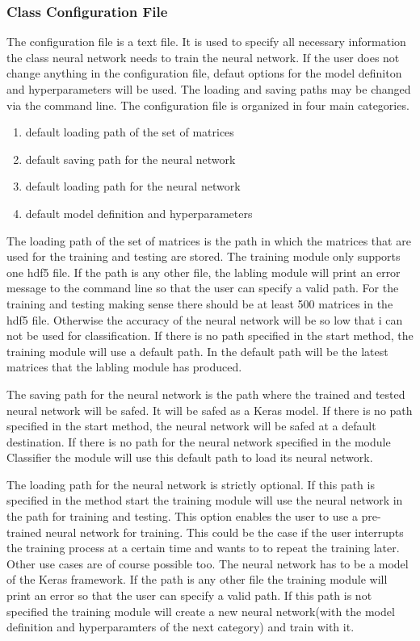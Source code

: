 \documentclass[parskip=full]{scrartcl}
\begin{document}
\subsubsection{Class Configuration File}
The configuration file is a text file.
It is used to specify all necessary information the class neural network needs to train the neural network.
If the user does not change anything in the configuration file, defaut options for the model definiton and hyperparameters will be used. The loading and saving paths may be changed via the command line. The configuration file is organized in four main categories.
\begin{enumerate}
\item default loading path of the set of matrices 
\item default saving path for the neural network
\item default loading path for the neural network
\item default model definition and hyperparameters
\end{enumerate}
The loading path of the set of matrices is the path in which the matrices that are used for the training and testing are stored.
The training module only supports one hdf5 file.
If the path is any other file, the labling module will print an error message to the command line so that the user can specify a valid path.
For the training and testing making sense there should be at least 500 matrices in the hdf5 file.
Otherwise the accuracy of the neural network will be so low that i can not be used for classification.
If there is no path specified in the start method, the training module will use a default path.
In the default path will be the latest matrices that the labling module has produced. \newline

The saving path for the neural network is the path where the trained and tested neural network will be safed.
It will be safed as a Keras model.
If there is no path specified in the start method, the neural network will be safed at a default destination.
If there is no path for the neural network specified in the module Classifier the module will use this default path to load its neural network.\newline

The loading path for the neural network is strictly optional.
If this path is specified in the method start the training module will use the neural network in the path for training and testing.
This option enables the user to use a pre-trained neural network for training.
This could be the case if the user interrupts the training process at a certain time and wants to to repeat the training later.
Other use cases are of course possible too.
The neural network has to be a model of the Keras framework. If the path is any other file the training module will print an error so that the user can specify a valid path.
If this path is not specified the training module will create a new neural network(with the model definition and hyperparamters of the next category) and train with it. \newline
\end{document}
